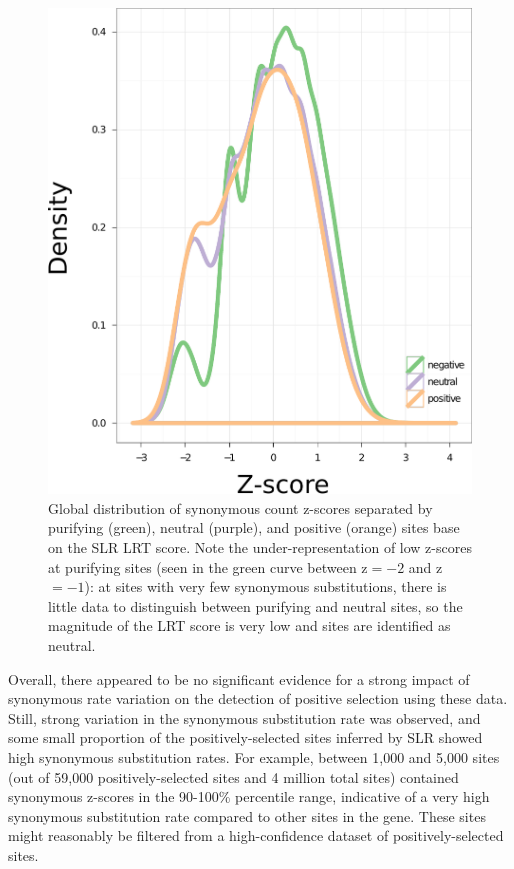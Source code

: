 \begin{figure}
\centering
\includegraphics[scale=0.6]{Figs/zscore_density.pdf}
\caption{Global distribution of synonymous count z-scores separated by
  purifying (green), neutral (purple), and positive (orange) sites
  base on the SLR LRT score. Note the under-representation of low
  z-scores at purifying sites (seen in the green curve between z$=-2$
  and z$=-1$): at sites with very few synonymous substitutions, there
  is little data to distinguish between purifying and neutral sites,
  so the magnitude of the LRT score is very low and sites are
  identified as neutral.}
\label{fig_zscore_density}
\end{figure}

Overall, there appeared to be no significant evidence for a strong
impact of synonymous rate variation on the detection of positive
selection using these data. Still, strong variation in the synonymous
substitution rate was observed, and some small proportion of the
positively-selected sites inferred by SLR showed high synonymous
substitution rates. For example, between 1,000 and 5,000 sites (out of
59,000 positively-selected sites and 4 million total sites) contained
synonymous z-scores in the 90-100\% percentile range, indicative of a
very high synonymous substitution rate compared to other sites in the
gene. These sites might reasonably be filtered from a high-confidence
dataset of positively-selected sites. 

